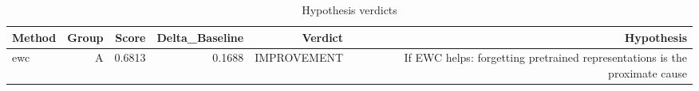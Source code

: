 \begin{table}[htbp]
\centering
\caption{Hypothesis verdicts}
\label{tab:hyp-verdicts}
\begin{tabular}{lrrrrr}
\toprule
\textbf{Method} & \textbf{Group} & \textbf{Score} & \textbf{Delta\_Baseline} & \textbf{Verdict} & \textbf{Hypothesis} \\
\midrule
ewc & A & 0.6813 & 0.1688 & IMPROVEMENT & If EWC helps: forgetting pretrained representations is the proximate cause \\
\bottomrule
\end{tabular}
\end{table}
